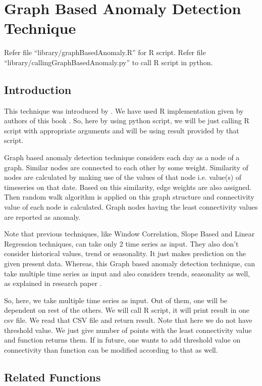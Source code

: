 \chapter{Graph Based Anomaly Detection Technique}

Refer file ``library/graphBasedAnomaly.R'' for R script. Refer file ``library/callingGraphBasedAnomaly.py'' to call R script in python.

\section{Introduction}

This technique was introduced by \cite{nasa}. We have used R implementation given by 
authors of this book \cite{nasarbook}. So, here by using python script, we will be just 
calling R script with appropriate arguments and will be using result provided 
by that script.

Graph based anomaly detection technique considers each day as a  node of a 
graph. Similar nodes are connected to each other by some weight. Similarity of 
nodes are calculated by making use of the values of that node i.e. value(s) of 
timeseries on that date. Based on this similarity, edge weights are also 
assigned. Then random walk algorithm is applied on this graph structure and 
connectivity value of each node is calculated. Graph nodes having the least 
connectivity values are reported as anomaly.

Note that previous techniques, like Window 
Correlation, Slope Based and Linear Regression techniques, can take only 2 time 
series as input. They also don't consider historical values, trend or 
seasonality. It just makes prediction on the given present data. Whereas, this 
Graph based anomaly detection technique, can take multiple time series as input 
and also considers trends, seasonality as well, as explained in research paper 
\cite{nasa}.

So, here, we take multiple time series as input. Out of them, one will be 
dependent on rest of the others. We will call R script, it will print result in 
one csv file. We read that CSV file and return result. Note that here we do not 
have threshold value. We just give number of points with the least connectivity 
value and function returns them. If in future, one wants to add threshold value 
on connectivity than function can be modified according to that as well.

\section{Related Functions}

